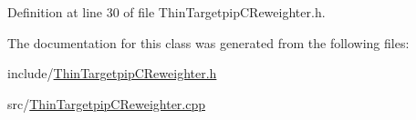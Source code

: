Definition at line 30 of file Thin\-Targetpip\-C\-Reweighter.\-h.



The documentation for this class was generated from the following files\-:\begin{DoxyCompactItemize}
\item 
include/\hyperlink{_thin_targetpip_c_reweighter_8h}{Thin\-Targetpip\-C\-Reweighter.\-h}\item 
src/\hyperlink{_thin_targetpip_c_reweighter_8cpp}{Thin\-Targetpip\-C\-Reweighter.\-cpp}\end{DoxyCompactItemize}
